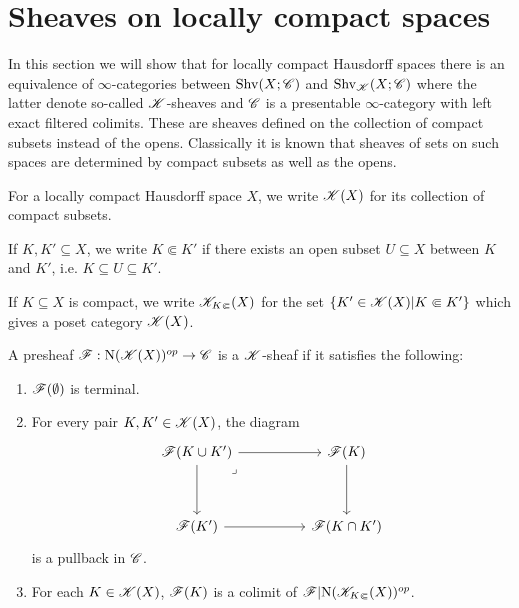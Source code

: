 \documentclass[../../thesis.tex]{subfiles}
\begin{document}
\section{Sheaves on locally compact spaces}
In this section we will show that for locally compact Hausdorff spaces there is an equivalence of $\infty$-categories between $\mathrm{Shv}(X;\mathscr{C})$ and $\mathrm{Shv}_{\mathscr{K}}(X;\mathscr{C})$ where the latter denote so-called $\mathscr{K}$-sheaves and $\mathscr{C}$ is a presentable $\infty$-category with left exact filtered colimits.
These are sheaves defined on the collection of compact subsets instead of the opens.
Classically it is known that sheaves of sets on such spaces are determined by compact subsets as well as the opens.
\begin{definition}
    For a locally compact Hausdorff space $X$, we write $\mathscr{K}(X)$ for its collection of compact subsets.
\end{definition}
\begin{definition}
    If $K, K' \subseteq X$, we write $K \Subset K'$ if there exists an open subset $U\subseteq X$ between $K$ and $K'$, i.e. $K \subseteq U \subseteq K'$.
\end{definition}
\begin{definition}
    If $K\subseteq X$ is compact, we write $\mathscr{K}_{K\Subset}(X)$ for the set $\{ K'\in \mathscr{K}(X) | K \Subset K' \}$ which gives a poset category $\mathscr{K}(X)$.
\end{definition}
\begin{definition}
    A presheaf $\mathscr{F}:\mathrm{N}(\mathscr{K}(X))^{op}\to \mathscr{C}$ is a $\mathscr{K}$-sheaf if it satisfies the following:
    \begin{enumerate}
        \item $\mathscr{F}(\emptyset)$ is terminal.
        \item For every pair $K,K'\in \mathscr{K}(X)$, the diagram
              \[\begin{tikzcd}
                      {\F(K \cup K')} && {\F(K)} \\
                      \\
                      {\F(K')} && {\F(K\cap K')}
                      \arrow[from=1-3, to=3-3]
                      \arrow[from=3-1, to=3-3]
                      \arrow[from=1-1, to=3-1]
                      \arrow["\lrcorner"{anchor=center, pos=0.125}, draw=none, from=1-1, to=3-3]
                      \arrow[from=1-1, to=1-3]
                  \end{tikzcd}\]
              is a pullback in $\mathscr{C}$.
        \item For each $K\in \mathscr{K}(X)$, $\mathscr{F}(K)$ is a colimit of $\mathscr{F}|\mathrm{N}(\mathscr{K}_{K\Subset}(X))^{op}$.
    \end{enumerate}
\end{definition}
\end{document}
